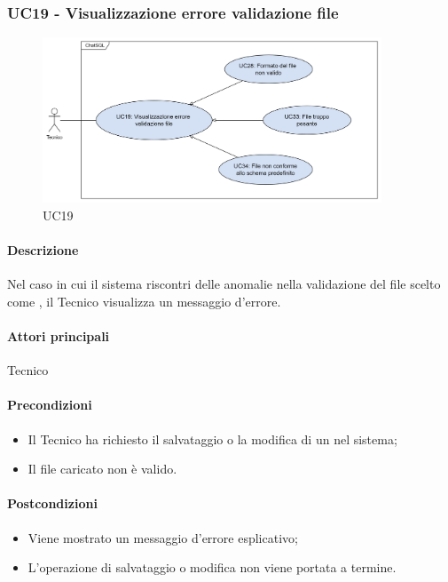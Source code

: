 \subsubsection{UC19 - Visualizzazione errore validazione file}\label{UC19}

\begin{figure}[H]
  \centering
  \includegraphics[width=0.90\textwidth]{assets/uc19.png}
  \caption{UC19}
\end{figure}

\paragraph*{Descrizione}
Nel caso in cui il sistema riscontri delle anomalie nella validazione del file scelto come , il Tecnico visualizza un messaggio d'errore.

\paragraph*{Attori principali}
Tecnico

\paragraph*{Precondizioni}
\begin{itemize}
  \item Il Tecnico ha richiesto il salvataggio o la modifica di un  nel sistema;
  \item Il file caricato non è valido.
\end{itemize}

\paragraph*{Postcondizioni}
\begin{itemize}
  \item Viene mostrato un messaggio d'errore esplicativo;
  \item L'operazione di salvataggio o modifica non viene portata a termine.
\end{itemize}

